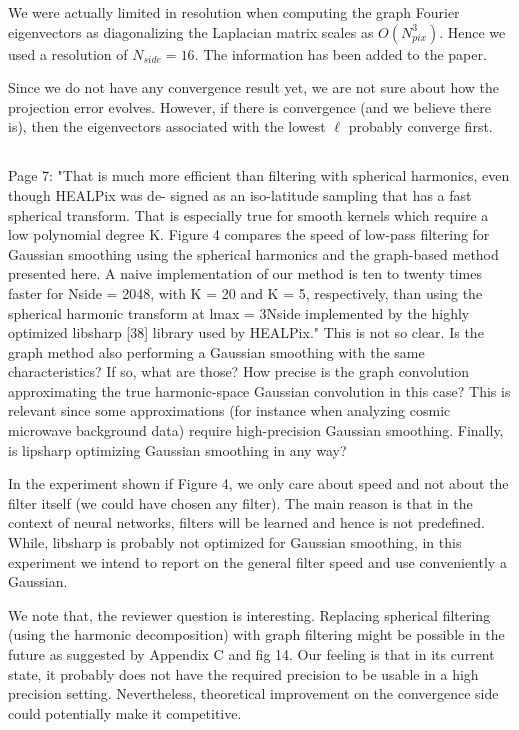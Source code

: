 \documentclass[12pt,a4paper]{article}
\newcommand{\todo}[1]{{\color[rgb]{.6,.1,.6}{TODO: #1}}}
\newcommand{\1}{\b{1}}              %
\newcommand{\0}{\b{0}}              %
\begin{document}
\todo{Assigned: @nati}
We were actually limited in resolution when computing the graph Fourier eigenvectors as diagonalizing the Laplacian matrix scales as $O(N_{pix}^3)$. Hence we used a resolution of $N_{side}=16$. The information has been added to the paper.

Since we do not have any convergence result yet, we are not sure about how the projection error evolves. However, if there is convergence (and we believe there is), then the eigenvectors associated with the lowest $\ell$ probably converge first.

\subsection{}
\begin{mdframed}[style=comment]
Page 7: "That is much more efficient than filtering with spherical harmonics, even though HEALPix was de- signed as an iso-latitude sampling that has a fast spherical transform. That is especially true for smooth kernels which require a low polynomial degree K. Figure 4 compares the speed of low-pass filtering for Gaussian smoothing using the spherical harmonics and the graph-based method presented here. A naive implementation of our method is ten to twenty times faster for Nside = 2048, with K = 20 and K = 5, respectively, than using the spherical harmonic transform at lmax = 3Nside implemented by the highly optimized libsharp [38] library used by HEALPix." This is not so clear. Is the graph method also performing a Gaussian smoothing with the same characteristics? If so, what are those? How precise is the graph convolution approximating the true harmonic-space Gaussian convolution in this case? This is relevant since some approximations (for instance when analyzing cosmic microwave background data) require high-precision Gaussian smoothing. Finally, is lipsharp optimizing Gaussian smoothing in any way?
\end{mdframed}
\todo{Assigned: @nati,
Tocheck: @tomek, @michael
}

In the experiment shown if Figure 4, we only care about speed and not about the filter itself (we could have chosen any filter). The main reason is that in the context of neural networks, filters will be learned and hence is not predefined.
While, libsharp is probably not optimized for Gaussian smoothing, in this experiment we intend to report on the general filter speed and use conveniently a Gaussian.

We note that, the reviewer question is interesting. Replacing spherical filtering (using the harmonic decomposition) with graph filtering might be possible in the future as suggested by Appendix C and fig 14.
Our feeling is that in its current state, it probably does not have the required precision to be usable in a high precision setting. Nevertheless, theoretical improvement on the convergence side could potentially make it competitive.
\end{document}
